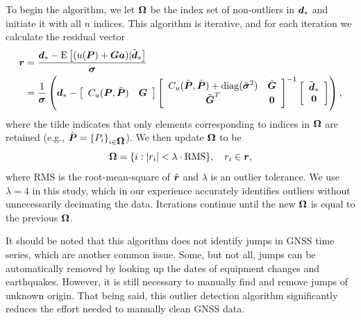 \documentclass[extra,mreferee]{gji}
\begin{document}
To begin the algorithm, we let $\mitbf{\Omega}$ be the index set of non-outliers in $\mitbf{d}_*$ and initiate it with all $n$ indices. This algorithm is iterative, and for each iteration we calculate the residual vector
\begin{align}\label{eq:Residual}
\mitbf{r} &= \frac{\mitbf{d}_* - \mathrm{E}\left[(u(\mitbf{P}) + \mitbf{G}\mitbf{a})|\tilde{\mitbf{d}}_* \right]}{\mitbf{\sigma}} \\
       &= \frac{1}{\mitbf{\sigma}}\left(\mitbf{d}_*  - 
          \left[\begin{array}{cc}
                C_u(\mitbf{P},\tilde{\mitbf{P}}) & \mitbf{G} \\
                \end{array}\right]
          \left[\begin{array}{cc}
                C_u(\tilde{\mitbf{P}},\tilde{\mitbf{P}}) + \mathrm{diag}(\tilde{\mitbf{\sigma}}^2) & \tilde{\mitbf{G}} \\
                \tilde{\mitbf{G}}^T  & \mitbf{0} \\
                \end{array}\right]^{-1}
          \left[\begin{array}{c}
                \tilde{\mitbf{d}}_* \\
                \mitbf{0} \\
                \end{array}\right]\right),
\end{align}
where the tilde indicates that only elements corresponding to indices in $\mitbf{\Omega}$ are retained (e.g., $\tilde{\mitbf{P}} = \{P_i\}_{i\in\mitbf{\Omega}}$). We then update $\mitbf{\Omega}$ to be
\begin{equation}\label{eq:Update}
\mitbf{\Omega} = \{i : |r_i| < \lambda \cdot \mathrm{RMS}\}, \ \ \ r_i \in \mitbf{r},
\end{equation} 
where RMS is the root-mean-square of $\tilde{\mitbf{r}}$ and $\lambda$ is an outlier tolerance. We use $\lambda=4$ in this study, which in our experience accurately identifies outliers without unnecessarily decimating the data. Iterations continue until the new $\mitbf{\Omega}$ is equal to the previous $\mitbf{\Omega}$. 

It should be noted that this algorithm does not identify jumps in GNSS time series, which are another common issue. Some, but not all, jumps can be automatically removed by looking up the dates of equipment changes and earthquakes. However, it is still necessary to manually find and remove jumps of unknown origin. That being said, this outlier detection algorithm significantly reduces the effort needed to manually clean GNSS data.       
\end{document}
